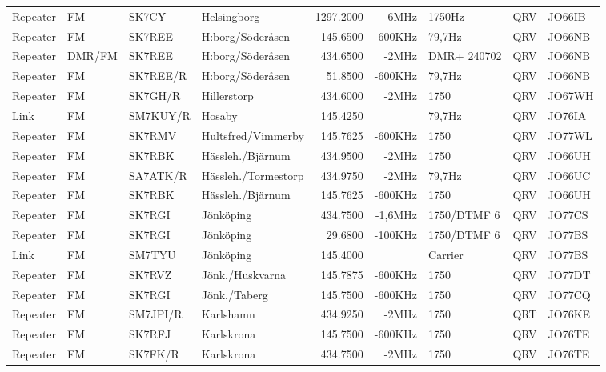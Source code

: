 \begin{longtable}{llllrrlcl}
Repeater & FM     & SK7CY    & Helsingborg         & 1297.2000 & -6MHz   & 1750Hz       & QRV  & JO66IB \\
Repeater & FM     & SK7REE   & H:borg/Söderåsen    & 145.6500  & -600KHz & 79,7Hz       & QRV  & JO66NB \\
Repeater & DMR/FM & SK7REE   & H:borg/Söderåsen    & 434.6500  & -2MHz   & DMR+ 240702  & QRV  & JO66NB \\
Repeater & FM     & SK7REE/R & H:borg/Söderåsen    & 51.8500   & -600KHz & 79,7Hz       & QRV  & JO66NB \\
Repeater & FM     & SK7GH/R  & Hillerstorp         & 434.6000  & -2MHz   & 1750         & QRV  & JO67WH \\
Link     & FM     & SM7KUY/R & Hosaby              & 145.4250  &         & 79,7Hz       & QRV  & JO76IA \\
Repeater & FM     & SK7RMV   & Hultsfred/Vimmerby  & 145.7625  & -600KHz & 1750         & QRV  & JO77WL \\
Repeater & FM     & SK7RBK   & Hässleh./Bjärnum    & 434.9500  & -2MHz   & 1750         & QRV  & JO66UH \\
Repeater & FM     & SA7ATK/R & Hässleh./Tormestorp & 434.9750  & -2MHz   & 79,7Hz       & QRV  & JO66UC \\
Repeater & FM     & SK7RBK   & Hässleh./Bjärnum    & 145.7625  & -600KHz & 1750         & QRV  & JO66UH \\
Repeater & FM     & SK7RGI   & Jönköping           & 434.7500  & -1,6MHz & 1750/DTMF 6  & QRV  & JO77CS \\
Repeater & FM     & SK7RGI   & Jönköping           & 29.6800   & -100KHz & 1750/DTMF 6  & QRV  & JO77BS \\
Link     & FM     & SM7TYU   & Jönköping           & 145.4000  &         & Carrier      & QRV  & JO77BS \\
Repeater & FM     & SK7RVZ   & Jönk./Huskvarna     & 145.7875  & -600KHz & 1750         & QRV  & JO77DT \\
Repeater & FM     & SK7RGI   & Jönk./Taberg        & 145.7500  & -600KHz & 1750         & QRV  & JO77CQ \\
Repeater & FM     & SM7JPI/R & Karlshamn           & 434.9250  & -2MHz   & 1750         & QRT  & JO76KE \\
Repeater & FM     & SK7RFJ   & Karlskrona          & 145.7500  & -600KHz & 1750         & QRV  & JO76TE \\
Repeater & FM     & SK7FK/R  & Karlskrona          & 434.7500  & -2MHz   & 1750         & QRV  & JO76TE \\

\end{longtable}
